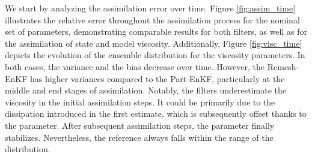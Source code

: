 We start by analyzing the assimilation error over time. Figure \ref{fig:assim_time} illustrates the relative error throughout the assimilation process for the nominal set of parameters, demonstrating comparable results for both filters, as well as for the assimilation of state and model viscosity. Additionally, Figure \ref{fig:visc_time} depicts the evolution of the ensemble distribution for the viscosity parameters. In both cases, the variance and the bias decrease over time. However, the Remesh-EnKF has higher variances compared to the Part-EnKF, particularly at the middle and end stages of assimilation. Notably, the filters underestimate the viscosity in the initial assimilation steps. It could be primarily due to the dissipation introduced in the first estimate, which is subsequently offset thanks to the parameter. After subsequent assimilation steps, the parameter finally stabilizes. Nevertheless, the reference always falls within the range of the distribution.


